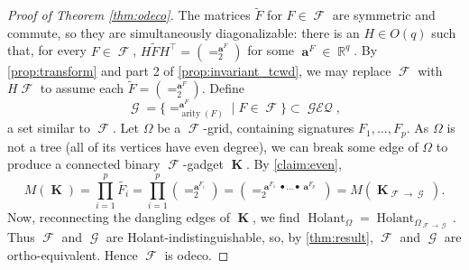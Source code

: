 \documentclass{theoretics}
\DeclareMathOperator{\rr}{\mathbb{R}}
\DeclareMathOperator{\arity}{arity}
\DeclareMathOperator{\vk}{\mathbf{K}}
\DeclareMathOperator{\va}{\mathbf{a}}
\DeclareMathOperator{\fc}{\mathcal{F}}
\DeclareMathOperator{\gc}{\mathcal{G}}
\DeclareMathOperator{\holant}{Holant}
\DeclareMathOperator{\geneq}{\mathcal{GEQ}}
\begin{document}
\begin{proof}[Proof of Theorem \ref{thm:odeco}]
    The matrices $\widetilde{F}$ for $F \in \fc$ are symmetric and commute, so they are simultaneously diagonalizable:
    there is an $H \in O(q)$ such that, for every $F \in \fc$, $H\widetilde{F}H^\top = (=_2^{\va^F})$ 
    for some $\va^F \in \rr^{q}$.
    By \autoref{prop:transform} and part 2 of \autoref{prop:invariant_tcwd},
    we may replace $\fc$ with $H\fc$ to assume each $\widetilde{F} = (=_2^{\va^F})$. Define
    \[
       \gc = \{=_{\arity(F)}^{\va^F} \mid F \in \fc\} \subset \geneq,
    \]
    a set similar to $\fc$.
    Let $\Omega$ be a $\fc$-grid,
    containing signatures $F_1,\ldots,F_p$.
    As $\Omega$ is not a tree (all of its vertices have even degree), we can break some edge of $\Omega$
    to produce a connected binary $\fc$-gadget $\vk$. By \autoref{claim:even},
    \[
        M(\vk) = \prod_{i=1}^{p} \widetilde{F_i} = \prod_{i=1}^{p}(=_2^{\va^{F_i}})
        = \left(=_2^{\va^{F_1} \bullet \ldots \bullet \va^{F_p}}\right) = M(\vk_{\fc\to\gc}).
    \]
    Now, reconnecting the dangling edges of $\vk$, we find $\holant_{\Omega} = 
    \holant_{\Omega_{\fc\to\gc}}$. Thus $\fc$ and $\gc$ are Holant-indistinguishable, so, by
    \autoref{thm:result}, $\fc$ and $\gc$ are ortho-equivalent. Hence $\fc$ is odeco.


\end{proof}
\end{document}
